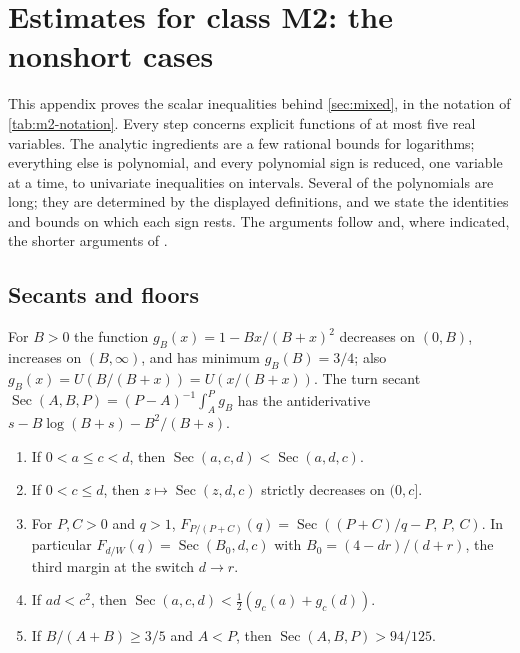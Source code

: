 \section{Estimates for class M2: the nonshort cases}\label{app:nonshort-estimates}

This appendix proves the scalar inequalities behind \cref{sec:mixed}, in the notation of
\cref{tab:m2-notation}. Every step concerns explicit functions of at most five real variables.
The analytic ingredients are a few rational bounds for logarithms; everything else is polynomial,
and every polynomial sign is reduced, one variable at a time, to univariate inequalities on
intervals. Several of the polynomials are long; they are determined by the displayed definitions,
and we state the identities and bounds on which each sign rests. The arguments follow
\cite{Notes} and, where indicated, the shorter arguments of \cite{LighterProofs}.

\subsection{Secants and floors}\label{app:m2-secants}

For $B>0$ the function $g_B(x)=1-Bx/(B+x)^2$ decreases on $(0,B)$, increases on $(B,\infty)$, and
has minimum $g_B(B)=3/4$; also $g_B(x)=U(B/(B+x))=U(x/(B+x))$. The turn secant
$\operatorname{Sec}(A,B,P)=(P-A)^{-1}\int_A^Pg_B$ has the antiderivative
$s-B\log(B+s)-B^2/(B+s)$.

\begin{lemma}[Secants]\label{lem:m2-secants}
\begin{enumerate}[label=(\alph*)]
\item If $0<a\le c<d$, then $\operatorname{Sec}(a,c,d)<\operatorname{Sec}(a,d,c)$.
\item If $0<c\le d$, then $z\mapsto\operatorname{Sec}(z,d,c)$ strictly decreases on $(0,c]$.
\item For $P,C>0$ and $q>1$, $F_{P/(P+C)}(q)=\operatorname{Sec}((P+C)/q-P,\,P,\,C)$. In particular
$F_{d/W}(q)=\operatorname{Sec}(B_0,d,c)$ with $B_0=(4-dr)/(d+r)$, the third margin at the switch
$d\to r$.
\item If $ad<c^2$, then $\operatorname{Sec}(a,c,d)<\frac12(g_c(a)+g_c(d))$.
\item If $B/(A+B)\ge3/5$ and $A<P$, then $\operatorname{Sec}(A,B,P)>94/125$.
\end{enumerate}
\end{lemma}

